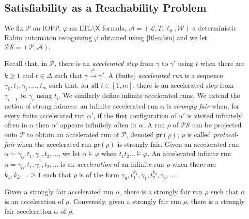 \documentclass[10pt,a4paper]{article}
\renewcommand{\geq}{\geqslant}
\newcommand{\nset}[2]{[#1,#2]}
\newcommand{\prot}{\mathcal{P}}
\newcommand{\accrun}{\alpha}
\newcommand{\config}{\gamma}
\newcommand{\step}[1]{\xrightarrow{#1}}
\newcommand{\run}{\rho}
\newcommand{\transitions}{\Delta}
\newcommand*{\atrans}{t}
\newcommand{\PP}{\mathcal{P}}                  %
\newcommand*{\buchiaut}{\mathcal{A}}
\newcommand{\bstates}{\mathcal{L}}
\newcommand{\btransitions}{T}
\newcommand*{\abuchistate}{\ell}
\newcommand*{\bstate}{\abuchistate}
\newcommand*{\binitstate}{\bstate_0}
\newcommand*{\bwinning}{\mathcal{W}}
\newcommand{\prodsystem}{\mathcal{PS}}
\newcommand{\ltlnext}{\mathsf{X}}
\newcommand{\protproj}[1]{\mathsf{pr}(#1)}
\begin{document}
%
%

%
\subsection{Satisfiability as a Reachability Problem}

We fix \(\PP\) an IOPP, \(\varphi\) an LTL\(\setminus \ltlnext\) formula, \(\buchiaut = (\bstates, \btransitions, \binitstate, \bwinning) \) a deterministic Rabin automaton recognizing \(\varphi\) obtained using \cref{ltl-rabin} and we let \(\prodsystem = (\prot, \buchiaut)\).

Recall that, in \(\prot\), there is an \emph{accelerated step} from \(\config\) to \(\config'\) using \(\atrans\) when there are \(k \geq 1\) and \(t \in \transitions\) such that \(\config \step{t^k} \config'\).
A (finite) \emph{accelerated run} is a sequence \(\config_0, \atrans_1, \config_1, \dots, \atrans_m\) such that, for all \(i \in \nset{1}{m}\), there is an accelerated step from \(\config_{i-1}\) to \(\config_i\) using \(\atrans_i\).
We similarly define infinite accelerated runs.
We extend the notion of strong fairness: an infinite accelerated run \(\accrun\) is \emph{strongly fair} when, for every finite accelerated run \(\accrun'\), if the first configuration of \(\accrun'\) is visited infinitely often in \(\accrun\) then \(\accrun'\) appears infinitely often in \(\accrun\).
A run \(\run\) of \(\prodsystem\) can be projected onto \(\prot\) to obtain an accelerated run of \(\prot\), denoted \(\protproj{\run}\); \(\run\) is called \emph{protocol-fair} when the accelerated run \(\protproj{\run}\) is strongly fair.
Given an accelerated run \(\accrun = \config_0, \atrans_1, \config_1, \atrans_2, \dots\), we let \(\accrun \models \varphi\) when \(\atrans_1 \atrans_2 \dots \models \varphi\).
%
An accelerated infinite run \(\accrun= \config_0, \atrans_1, \config_1, \atrans_2, \dots\) is an \emph{acceleration} of an infinite run \(\run\) when there are \(k_1, k_2,\ldots \geq 1\) such that \(\run\) is of the form
\(\config_0, \atrans_1^{k_1}, \config_1, \atrans_2^{k_2}, \config_2, \ldots\)
%
%
\begin{lemmarep}
	\label{strongly-fair-acceleration}
	Given a strongly fair accelerated run \(\accrun\), there is a strongly fair run \(\run\) such that \(\accrun\) is an acceleration of \(\run\).
	Conversely, given a strongly fair run \(\run\), there is a strongly fair acceleration \(\accrun\) of \(\run\).
\end{lemmarep}
\end{document}
